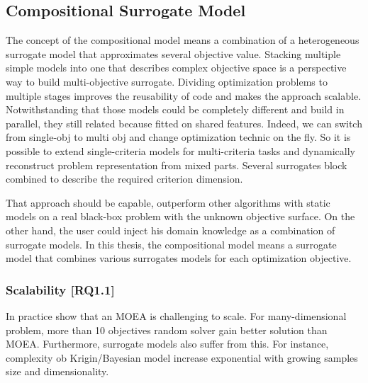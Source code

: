         \subsection{Compositional Surrogate Model}

            The concept of the compositional model means a combination of a heterogeneous surrogate model that approximates several objective value. Stacking multiple simple models into one that describes complex objective space is a perspective way to build multi-objective surrogate. Dividing optimization problems to multiple stages improves the reusability of code and makes the approach scalable. 
            Notwithstanding that those models could be completely different and build in parallel, they still related because fitted on shared features. Indeed, we can switch from single-obj to multi obj and change optimization technic on the fly. So it is possible to extend single-criteria models for multi-criteria tasks and dynamically reconstruct problem representation from mixed parts. Several surrogates block combined to describe the required criterion dimension. 
            

            That approach should be capable, outperform other algorithms with static models on a real black-box problem with the unknown objective surface. On the other hand, the user could inject his domain knowledge as a combination of surrogate models. 
            In this thesis, the compositional model means a surrogate model that combines various surrogates models for each optimization objective.

            \subsubsection{Scalability [RQ1.1]}
                In practice show that an MOEA is challenging to scale. For many-dimensional problem, more than 10 objectives random solver gain better solution than MOEA. Furthermore, surrogate models also suffer from this. For instance, complexity ob Krigin/Bayesian model increase exponential with growing samples size and dimensionality.

